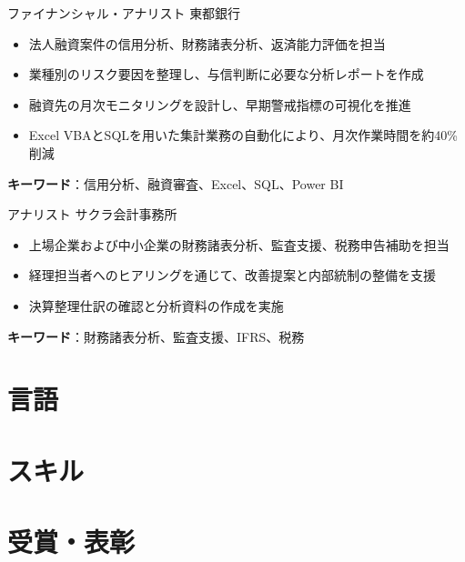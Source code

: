 \documentclass[a4paper, serif, 10pt]{moderncv}
\begin{document}
        {ファイナンシャル・アナリスト}
        {東都銀行}
        {}
        {}
        {\begin{itemize}
\item 法人融資案件の信用分析、財務諸表分析、返済能力評価を担当
\item 業種別のリスク要因を整理し、与信判断に必要な分析レポートを作成
\item 融資先の月次モニタリングを設計し、早期警戒指標の可視化を推進
\item Excel VBAとSQLを用いた集計業務の自動化により、月次作業時間を約40\%削減
\end{itemize}
\textbf{キーワード}：信用分析、融資審査、Excel、SQL、Power BI}

        {アナリスト}
        {サクラ会計事務所}
        {}
        {}
        {\begin{itemize}
\item 上場企業および中小企業の財務諸表分析、監査支援、税務申告補助を担当
\item 経理担当者へのヒアリングを通じて、改善提案と内部統制の整備を支援
\item 決算整理仕訳の確認と分析資料の作成を実施
\end{itemize}
\textbf{キーワード}：財務諸表分析、監査支援、IFRS、税務}
\section{言語}

\section{スキル}

\section{受賞・表彰}
\end{document}
